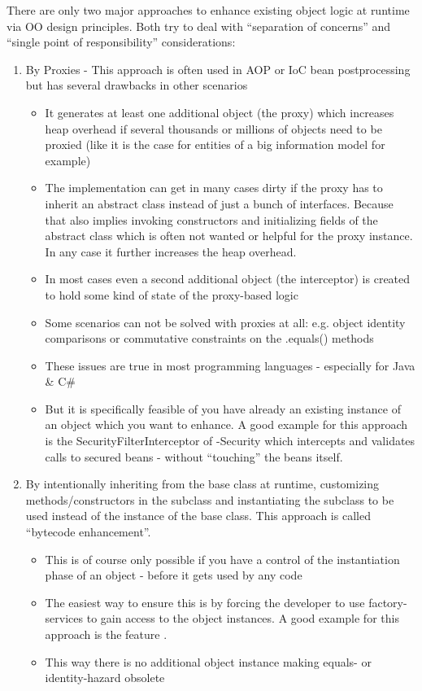 There are only two major approaches to enhance existing object logic at runtime via OO design principles. Both try to deal with ``separation of concerns'' and ``single point of responsibility'' considerations:
\begin{enumerate}
	\item By Proxies - This approach is often used in AOP or IoC bean postprocessing but has several drawbacks in other scenarios
		\begin{itemize}
			\item It generates at least one additional object (the proxy) which increases heap overhead if several thousands or millions of objects need to be proxied (like it is the case for entities of a big information model for example)
			\item The implementation can get in many cases dirty if the proxy has to inherit an abstract class instead of just a bunch of interfaces. Because that also implies invoking constructors and initializing fields of the abstract class which is often not wanted or helpful for the proxy instance. In any case it further increases the heap overhead.
			\item In most cases even a second additional object (the interceptor) is created to hold some kind of state of the proxy-based logic
			\item Some scenarios can not be solved with proxies at all: e.g. object identity comparisons or commutative constraints on the .equals() methods\cite{com14}
			\item These issues are true in most programming languages - especially for Java \& C\#
			\item But it is specifically feasible of you have already an existing instance of an object which you want to enhance. A good example for this approach is the SecurityFilterInterceptor of \AMBETH{}-Security which intercepts and validates calls to secured beans - without ``touching'' the beans itself.
		\end{itemize}
	\item By intentionally inheriting from the base class at runtime, customizing methods/constructors in the subclass and instantiating the subclass to be used instead of the instance of the base class. This approach is called ``bytecode enhancement''.
		\begin{itemize}
			\item This is of course only possible if you have a control of the instantiation phase of an object - before it gets used by any code
			\item The easiest way to ensure this is by forcing the developer to use factory-services to gain access to the object instances. A good example for this approach is the feature .
			\item This way there is no additional object instance making equals- or identity-hazard obsolete
		\end{itemize}
\end{enumerate}

